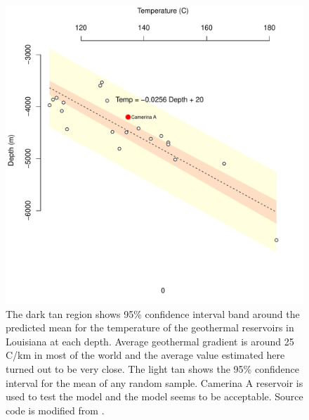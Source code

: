 \documentclass[review,authoryear, 12pt]{elsarticle}\usepackage[]{graphicx}\usepackage[]{color}
\makeatletter
\def\maxwidth{ %
  \ifdim\Gin@nat@width>\linewidth
    \linewidth
  \else
    \Gin@nat@width
  \fi
}
\newenvironment{knitrout}{}{} %
\makeatother
\begin{document}
\begin{knitrout}
\color{fgcolor}\begin{figure}[]

\includegraphics[width=\maxwidth]{figure/geothermal_gradient} \caption[The dark tan region shows 95\% confidence interval band around the predicted mean for the temperature of the geothermal reservoirs in Louisiana at each depth]{The dark tan region shows 95\% confidence interval band around the predicted mean for the temperature of the geothermal reservoirs in Louisiana at each depth. Average geothermal gradient is around 25 \degree C/km in most of the world \citep{fridleifsson2008possible} and the average value estimated here turned out to be very close. The light tan shows the 95\% confidence interval for the mean of any random sample. Camerina A reservoir is used to test the model and the model seems to be acceptable. Source code is modified from \citet{white_note}.\label{Fig:geothermal_gradient}}
\end{figure}


\end{knitrout}



\end{document}
